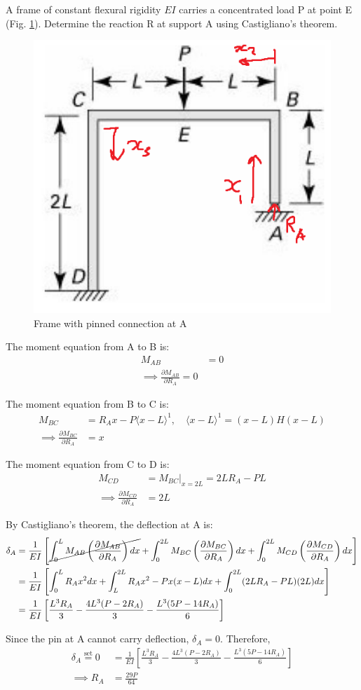 \section{}
A frame of constant flexural rigidity $EI$ carries a concentrated load P at point E (Fig. \ref{fig:Q6ProblemDiagram}). 
Determine the reaction R at support A using Castigliano's theorem.

\begin{figure}[h]
    \centering
    \includegraphics[width=0.5\linewidth]{Questions/Figures/Q6ProblemDiagram.png}
    \caption{Frame with pinned connection at A}
    \label{fig:Q6ProblemDiagram}
\end{figure}

The moment equation from A to B is:
\begin{align*}
    M_{AB} &= 0  \\
    \implies \frac{\partial M_{AB}}{\partial R_A} = 0 
\end{align*}

The moment equation from B to C is:
\begin{align*}
    M_{BC} &= R_A x - P \langle x - L \rangle^1, \quad \langle x - L \rangle^1 = (x-L)H\left(x - L\right)\\
    \implies \frac{\partial M_{BC}}{\partial R_A} &= x 
\end{align*}

The moment equation from C to D is:
\begin{align*}
    M_{CD} &= M_{BC}|_{x=2L} = 2LR_A - PL \\
    \implies \frac{\partial M_{CD}}{\partial R_A} &= 2L
\end{align*}

By Castigliano's theorem, the deflection at A is:
\begin{align*}
    \delta_A &= \frac{1}{EI} \left[\cancel{\int_{0}^{L} M_{AB} \left(\frac{\partial M_{AB}}{\partial R_A}\right) dx}
    + \int_{0}^{2L} M_{BC} \left(\frac{\partial M_{BC}}{\partial R_A}\right) dx 
    + \int_{0}^{2L} M_{CD} \left(\frac{\partial M_{CD}}{\partial R_A}\right) dx \right] \\
    &= \frac{1}{EI} \left[\int_{0}^{L} R_A x^2 dx + \int_{L}^{2L} R_A x^2 - Px(x-L) dx 
    + \int_{0}^{2L} (2LR_A - PL)(2L) dx \right] \\
    &= \frac{1}{EI} \left[\frac{L^3R_A}{3} - \frac{4L^3(P-2R_A)}{3} - \frac{L^3(5P-14R_A)}{6} \right] 
\end{align*} 

Since the pin at A cannot carry deflection, $\delta_A = 0$. Therefore,
\begin{align*}
    \delta_A \overset{\text{set}}{=} 0 &= \frac{1}{EI} \left[\frac{L^3R_A}{3} - \frac{4L^3(P-2R_A)}{3} - \frac{L^3(5P-14R_A)}{6} \right] \\
    \implies R_A &= \boxed{\frac{29P}{64}}
\end{align*}


